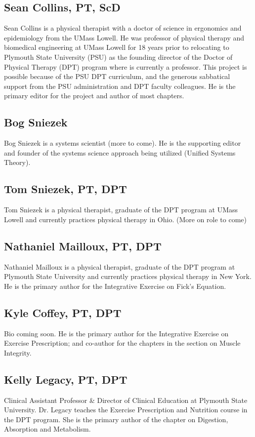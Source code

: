 { \subsection*{Sean Collins, PT, ScD}
Sean Collins is a physical therapist with a doctor of science in ergonomics and epidemiology from the UMass Lowell. He was professor of physical therapy and biomedical engineering at UMass Lowell for 18 years prior to relocating to Plymouth State University (PSU) as the founding director of the Doctor of Physical Therapy (DPT) program where is currently a professor. This project is possible because of the PSU DPT curriculum, and the generous sabbatical support from the PSU administration and DPT faculty colleagues. He is the primary editor for the project and author of most chapters.

\subsection*{Bog Sniezek}
Bog Sniezek is a systems scientist (more to come). He is the supporting editor and founder of the systems science approach being utilized (Unified Systems Theory).

\subsection*{Tom Sniezek, PT, DPT}
Tom Sniezek is a physical therapist, graduate of the DPT program at UMass Lowell and currently practices physical therapy in Ohio. (More on role to come)

\subsection*{Nathaniel Mailloux, PT, DPT}
Nathaniel Mailloux is a physical therapist, graduate of the DPT program at Plymouth State University and currently practices physical therapy in New York. He is the primary author for the Integrative Exercise on Fick's Equation.

\subsection*{Kyle Coffey, PT, DPT}
Bio coming soon. He is the primary author for the Integrative Exercise on Exercise Prescription; and co-author for the chapters in the section on Muscle Integrity.

\subsection*{Kelly Legacy, PT, DPT}
Clinical Assistant Professor \& Director of Clinical Education at Plymouth State University. Dr. Legacy teaches the Exercise Prescription and Nutrition course in the DPT program. She is the primary author of the chapter on Digestion, Absorption and Metabolism.

} %

